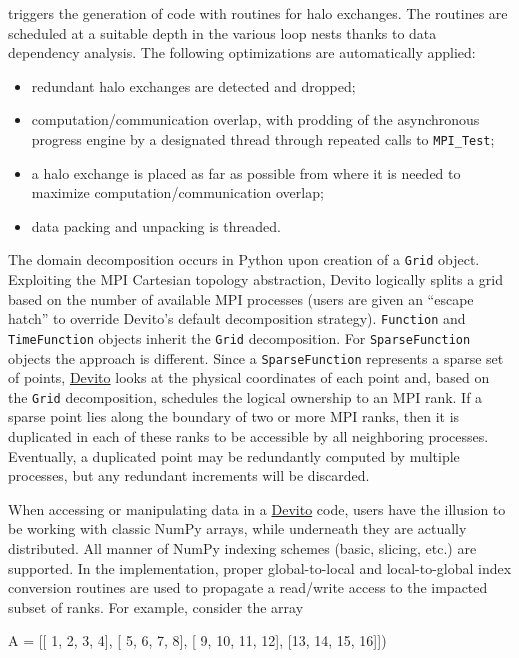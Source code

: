 \documentclass[conference]{IEEEtran}
\newenvironment{Shaded}{}{}
\newcommand{\DecValTok}[1]{\textcolor[rgb]{0.25,0.63,0.44}{{#1}}}
\newcommand{\NormalTok}[1]{{#1}}
\begin{document}
triggers the generation of code with routines for halo exchanges. The
routines are scheduled at a suitable depth in the various loop nests
thanks to data dependency analysis. The following optimizations are
automatically applied:

\begin{itemize}
\itemsep1pt\parskip0pt
\item
  redundant halo exchanges are detected and dropped;
\item
  computation/communication overlap, with prodding of the asynchronous
  progress engine by a designated thread through repeated calls to
  \texttt{MPI\_Test};
\item
  a halo exchange is placed as far as possible from where it is needed
  to maximize computation/communication overlap;
\item
  data packing and unpacking is threaded.
\end{itemize}

The domain decomposition occurs in Python upon creation of a \texttt{Grid}
object. Exploiting the MPI Cartesian topology abstraction, Devito
logically splits a grid based on the number of available MPI processes
(users are given an ``escape hatch'' to override Devito's default
decomposition strategy).  \texttt{Function} and \texttt{TimeFunction}
objects inherit the \texttt{Grid} decomposition. For
\texttt{SparseFunction} objects the approach is different. Since a
\texttt{SparseFunction} represents a sparse set of points, \href{https://github.com/devitocodes/devito}{Devito} looks at
the physical coordinates of each point and, based on the \texttt{Grid}
decomposition, schedules the logical ownership to an MPI rank. If a sparse
point lies along the boundary of two or more MPI ranks, then it is
duplicated in each of these ranks to be accessible by all neighboring
processes. Eventually, a duplicated point may be redundantly computed by
multiple processes, but any redundant increments will be discarded.

When accessing or manipulating data in a \href{https://github.com/devitocodes/devito}{Devito} code, users have the
illusion to be working with classic NumPy arrays, while underneath they
are actually distributed. All manner of NumPy indexing schemes (basic,
slicing, etc.) are supported. In the implementation, proper
global-to-local and local-to-global index conversion routines are used to
propagate a read/write access to the impacted subset of ranks. For
example, consider the array

\begin{Shaded}
\begin{Highlighting}[]
\NormalTok{A = [[ }\DecValTok{1}\NormalTok{,  }\DecValTok{2}\NormalTok{,  }\DecValTok{3}\NormalTok{,  }\DecValTok{4}\NormalTok{],}
     \NormalTok{[ }\DecValTok{5}\NormalTok{,  }\DecValTok{6}\NormalTok{,  }\DecValTok{7}\NormalTok{,  }\DecValTok{8}\NormalTok{],}
     \NormalTok{[ }\DecValTok{9}\NormalTok{, }\DecValTok{10}\NormalTok{, }\DecValTok{11}\NormalTok{, }\DecValTok{12}\NormalTok{],}
     \NormalTok{[}\DecValTok{13}\NormalTok{, }\DecValTok{14}\NormalTok{, }\DecValTok{15}\NormalTok{, }\DecValTok{16}\NormalTok{]])}
\end{Highlighting}
\end{Shaded}
\end{document}
